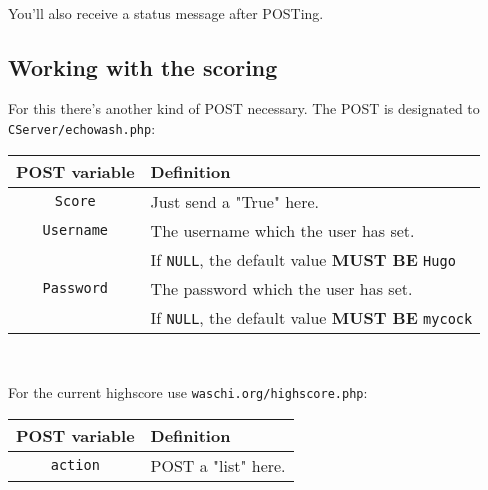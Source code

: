 \documentclass[letterpaper,twoside]{scrartcl}
\begin{document}
   \\
   \newline
   You'll also receive a status message after POSTing.\newline\newline


 \newpage


  \subsection{Working with the scoring}
   For this there's another kind of POST necessary.\newline
   The POST is designated to \texttt{CServer/echowash.php}:\newline\newline
   \begin{tabular}[ht]{|c|l|}
    \hline
    POST variable & Definition\\
    \hline\hline
    \texttt{Score} & Just send a "True" here.\\
    \hline
    \texttt{Username} & The username which the user has set.\\
 		   & If \texttt{NULL}, the default value \textbf{MUST BE} \texttt{Hugo}\\
    \hline
    \texttt{Password} & The password which the user has set.\\
		   & If \texttt{NULL}, the default value \textbf{MUST BE} \texttt{mycock}\\
    \hline
   \end{tabular}
   \\
   \newline

   For the current highscore use \texttt{waschi.org/highscore.php}:\newline\newline
   \begin{tabular}[ht]{|c|l|}
    \hline
    POST variable & Definition\\
    \hline\hline
    \texttt{action} & POST a "list" here.\\
    \hline
   \end{tabular}
   \\
\end{document}
